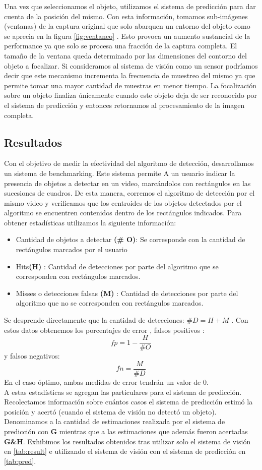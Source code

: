 	\indent Una vez que seleccionamos el objeto, utilizamos el sistema de predicción para dar cuenta de la posición del mismo. Con esta información, tomamos sub-imágenes (ventanas) de la captura original que solo abarquen un entorno del objeto como se aprecia en la figura \ref{fig:ventaneo} . Esto provoca un aumento sustancial de la performance ya que solo se procesa una fracción de la captura completa. El tamaño de la ventana queda determinado por las dimensiones del contorno del objeto a focalizar. Si consideramos al sistema de visión como un sensor podríamos decir que este mecanismo incrementa la frecuencia de muestreo del mismo ya que permite tomar una mayor cantidad de muestras en menor tiempo. La focalización sobre un objeto finaliza únicamente cuando este objeto deja de ser reconocido por el sistema de predicción y entonces retornamos al  procesamiento de la imagen completa. 


	
	
\subsection{Resultados}
Con el objetivo de  medir la efectividad del algoritmo de detección, desarrollamos un sistema de benchmarking. Este sistema permite
A un usuario indicar la presencia de objetos a detectar en un video, marcándolos con rectángulos en las sucesiones de cuadros. De esta
manera, corremos el algoritmo de detección por el mismo video y verificamos que los centroides de los objetos detectados por el algoritmo 
se encuentren contenidos dentro de los rectángulos indicados.  Para obtener estadísticas utilizamos la siguiente información:
\begin{itemize}
\item { Cantidad de objetos a detectar \textbf{(\# O)}: Se corresponde con la cantidad de rectángulos marcados por el usuario}
\item { Hits\textbf{(H)} : Cantidad de detecciones por parte del algoritmo que se corresponden con rectángulos marcados.}
\item { Misses o detecciones falsas \textbf{(M)} : Cantidad de detecciones por parte del algoritmo que no se corresponden con rectángulos marcados.}
\end{itemize}
Se desprende directamente que la cantidad de detecciones: $\#D=H+M$ .
Con estos datos obtenemos los porcentajes de error , falsos positivos : 
\[
	fp=1 - \frac{H}{\# O}
\]
y falsos negativos:
\[
	fn=\frac{M}{\# D}
\]
En el caso óptimo, ambas medidas de error tendrán un valor de $0$. \\
\indent A estas estadísticas se agregan las particulares para el sistema de predicción. Recolectamos información sobre
cuántos casos el sistema de predicción estimó la posición y acertó (cuando el sistema de visión no detectó un objeto). Denominamos
a la cantidad de estimaciones realizada por el sistema de predicción con \textbf{G} mientras que a las estimaciones que además fueron acertadas
\textbf{G\&H}. 
Exhibimos los resultados obtenidos tras utilizar solo el sistema de visión en \ref{tab:result} e utilizando el sistema de visión con el 
sistema de predicción en \ref{tab:pred}.

